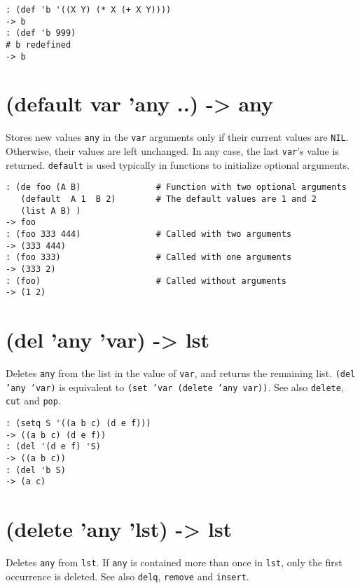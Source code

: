 {{{\begin{verbatim}
: (def 'b '((X Y) (* X (+ X Y))))
-> b
: (def 'b 999)
# b redefined
-> b
\end{verbatim}

 
\section{(default var 'any ..) -> any}
\label{sec-8-1-4-24}


Stores new values \texttt{any} in the \texttt{var} arguments only if their current
values are \texttt{NIL}. Otherwise, their values are left unchanged. In any
case, the last \texttt{var}'s value is returned. \texttt{default} is used typically in
functions to initialize optional arguments.


\begin{verbatim}
: (de foo (A B)               # Function with two optional arguments
   (default  A 1  B 2)        # The default values are 1 and 2
   (list A B) )
-> foo
: (foo 333 444)               # Called with two arguments
-> (333 444)
: (foo 333)                   # Called with one arguments
-> (333 2)
: (foo)                       # Called without arguments
-> (1 2)
\end{verbatim}

 
\section{(del 'any 'var) -> lst}
\label{sec-8-1-4-25}


Deletes \texttt{any} from the list in the value of \texttt{var}, and returns the
remaining list. \texttt{(del 'any 'var)} is equivalent to
\texttt{(set 'var (delete 'any var))}. See also \texttt{delete}, \texttt{cut} and \texttt{pop}.


\begin{verbatim}
: (setq S '((a b c) (d e f)))
-> ((a b c) (d e f))
: (del '(d e f) 'S)
-> ((a b c))
: (del 'b S)
-> (a c)
\end{verbatim}

 
\section{(delete 'any 'lst) -> lst}
\label{sec-8-1-4-26}


Deletes \texttt{any} from \texttt{lst}. If \texttt{any} is contained more than once in \texttt{lst},
only the first occurrence is deleted. See also \texttt{delq}, \texttt{remove} and
\texttt{insert}.


}}}
